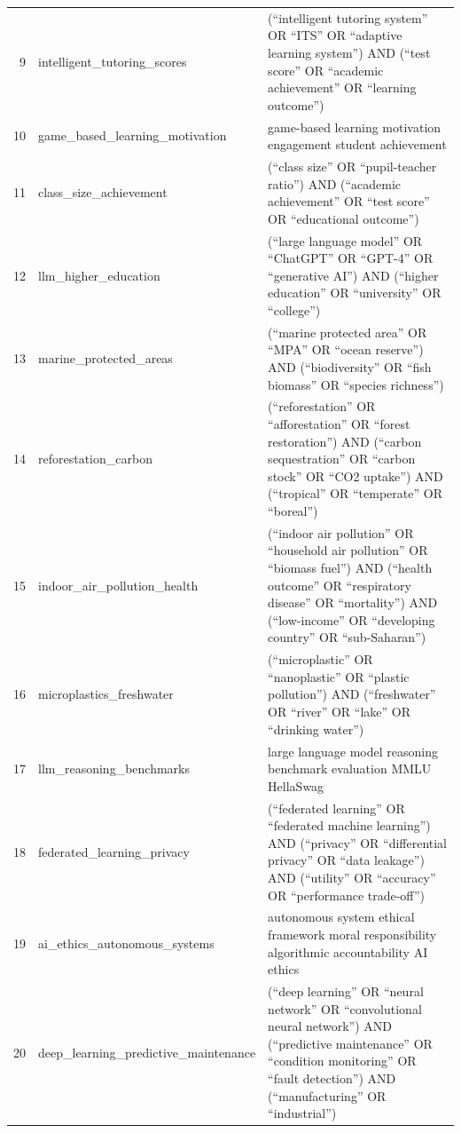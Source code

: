 \documentclass[12pt]{article}
\begin{document}
{\begin{longtable}{r p{6cm} p{7.5cm}}
9 & intelligent\_tutoring\_scores & (``intelligent tutoring system'' OR ``ITS'' OR ``adaptive learning system'') AND (``test score'' OR ``academic achievement'' OR ``learning outcome'') \\
10 & game\_based\_learning\_motivation & game-based learning motivation engagement student achievement \\
11 & class\_size\_achievement & (``class size'' OR ``pupil-teacher ratio'') AND (``academic achievement'' OR ``test score'' OR ``educational outcome'') \\
12 & llm\_higher\_education & (``large language model'' OR ``ChatGPT'' OR ``GPT-4'' OR ``generative AI'') AND (``higher education'' OR ``university'' OR ``college'') \\
13 & marine\_protected\_areas & (``marine protected area'' OR ``MPA'' OR ``ocean reserve'') AND (``biodiversity'' OR ``fish biomass'' OR ``species richness'') \\
14 & reforestation\_carbon & (``reforestation'' OR ``afforestation'' OR ``forest restoration'') AND (``carbon sequestration'' OR ``carbon stock'' OR ``CO2 uptake'') AND (``tropical'' OR ``temperate'' OR ``boreal'') \\
15 & indoor\_air\_pollution\_health & (``indoor air pollution'' OR ``household air pollution'' OR ``biomass fuel'') AND (``health outcome'' OR ``respiratory disease'' OR ``mortality'') AND (``low-income'' OR ``developing country'' OR ``sub-Saharan'') \\
16 & microplastics\_freshwater & (``microplastic'' OR ``nanoplastic'' OR ``plastic pollution'') AND (``freshwater'' OR ``river'' OR ``lake'' OR ``drinking water'') \\
17 & llm\_reasoning\_benchmarks & large language model reasoning benchmark evaluation MMLU HellaSwag \\
18 & federated\_learning\_privacy & (``federated learning'' OR ``federated machine learning'') AND (``privacy'' OR ``differential privacy'' OR ``data leakage'') AND (``utility'' OR ``accuracy'' OR ``performance trade-off'') \\
19 & ai\_ethics\_autonomous\_systems & autonomous system ethical framework moral responsibility algorithmic accountability AI ethics \\
20 & deep\_learning\_predictive\_maintenance & (``deep learning'' OR ``neural network'' OR ``convolutional neural network'') AND (``predictive maintenance'' OR ``condition monitoring'' OR ``fault detection'') AND (``manufacturing'' OR ``industrial'') \\
\end{longtable}
}%
\end{document}
